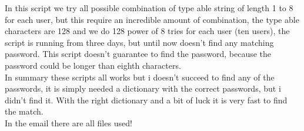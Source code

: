 \documentclass{article}
\begin{document}
In this script we try all possible combination of type able string of length 1 to 8 for each user, but this require an incredible amount of combination, the type able characters are 128 and we do 128 power of 8 tries for each user (ten users), the script is running from three days, but until now doesn't find any matching password. This script doesn't guarantee to find the password, because the password could be longer than eighth characters. \\
In summary these scripts all works but i doesn't succeed to find any of the passwords, it is simply needed a dictionary with the correct passwords, but i didn't find it. With the right dictionary and a bit of luck it is very fast to find the match.\\
In the email there are all files used!
\end{document}
